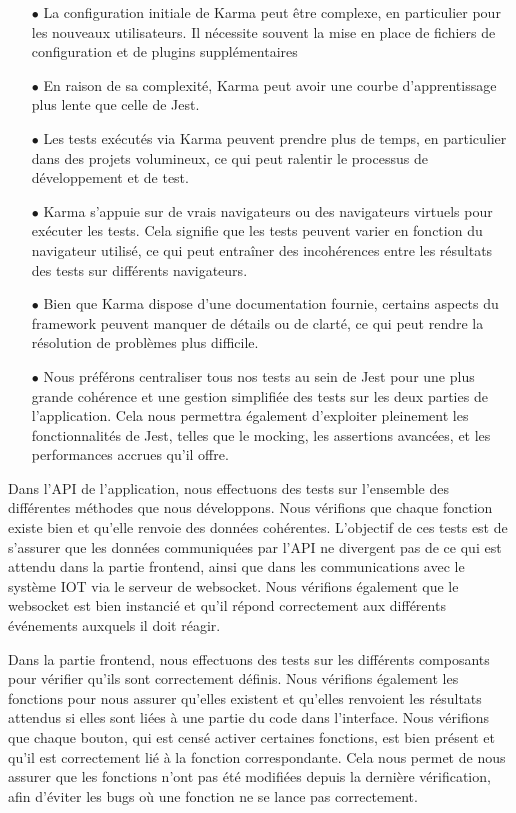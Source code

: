 \documentclass[12pt]{article}
\begin{document}
\begin{itemize}
    \item[$\bullet$] La configuration initiale de Karma peut être complexe, en particulier pour les nouveaux utilisateurs. Il nécessite souvent la mise en place de fichiers de configuration et de plugins supplémentaires
    \item[$\bullet$]  En raison de sa complexité, Karma peut avoir une courbe d'apprentissage plus lente que celle de Jest.
    \item[$\bullet$] Les tests exécutés via Karma peuvent prendre plus de temps, en particulier dans des projets volumineux, ce qui peut ralentir le processus de développement et de test.
    \item[$\bullet$]  Karma s'appuie sur de vrais navigateurs ou des navigateurs virtuels pour exécuter les tests. Cela signifie que les tests peuvent varier en fonction du navigateur utilisé, ce qui peut entraîner des incohérences entre les résultats des tests sur différents navigateurs.
    \item[$\bullet$] Bien que Karma dispose d'une documentation fournie, certains aspects du framework peuvent manquer de détails ou de clarté, ce qui peut rendre la résolution de problèmes plus difficile. 
    \item[$\bullet$] Nous préférons centraliser tous nos tests au sein de Jest pour une plus grande cohérence et une gestion simplifiée des tests sur les deux parties de l'application. Cela nous permettra également d'exploiter pleinement les fonctionnalités de Jest, telles que le mocking, les assertions avancées, et les performances accrues qu'il offre.


\end{itemize}
\justify
\text Dans l'API de l'application, nous effectuons des tests sur l'ensemble des différentes méthodes que nous développons. Nous vérifions que chaque fonction existe bien et qu'elle renvoie des données cohérentes. L'objectif de ces tests est de s'assurer que les données communiquées par l'API ne divergent pas de ce qui est attendu dans la partie frontend, ainsi que dans les communications avec le système IOT via le serveur de websocket. Nous vérifions également que le websocket est bien instancié et qu'il répond correctement aux différents événements auxquels il doit réagir.

\justify
\text Dans la partie frontend, nous effectuons des tests sur les différents composants pour vérifier qu'ils sont correctement définis. Nous vérifions également les fonctions pour nous assurer qu'elles existent et qu'elles renvoient les résultats attendus si elles sont liées à une partie du code dans l'interface. Nous vérifions que chaque bouton, qui est censé activer certaines fonctions, est bien présent et qu'il est correctement lié à la fonction correspondante. Cela nous permet de nous assurer que les fonctions n'ont pas été modifiées depuis la dernière vérification, afin d'éviter les bugs où une fonction ne se lance pas correctement.
\end{document}
